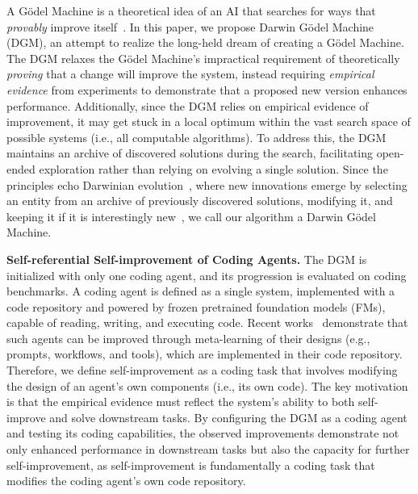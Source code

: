 \documentclass{article}
\begin{document}
A G\"odel Machine is a theoretical idea of an AI that searches for ways that \emph{provably} improve itself~\citep{schmidhuber2007godel}. In this paper, we propose Darwin G\"odel Machine (DGM), an attempt to realize the long-held dream of creating a G\"odel Machine. The DGM relaxes the G\"odel Machine's impractical requirement of theoretically \emph{proving} that a change will improve the system, instead requiring \emph{empirical evidence} from experiments to demonstrate that a proposed new version enhances performance. Additionally, since the DGM relies on empirical evidence of improvement, it may get stuck in a local optimum within the vast search space of possible systems (i.e., all computable algorithms). To address this, the DGM maintains an archive of discovered solutions during the search, facilitating open-ended exploration rather than relying on evolving a single solution. Since the principles echo Darwinian evolution~\citep{darwin2023origin}, where new innovations emerge by selecting an entity from an archive of previously discovered solutions, modifying it, and keeping it if it is interestingly new~\citep{zhang2024omni, faldor2025omni, stanley2015greatness}, we call our algorithm a Darwin G\"odel Machine.

\textbf{Self-referential Self-improvement of Coding Agents.}
The DGM is initialized with only one coding agent, and its progression is evaluated on coding benchmarks. A coding agent is defined as a single system, implemented with a code repository and powered by frozen pretrained foundation models (FMs), capable of reading, writing, and executing code. Recent works~\citep{hu2025automated, zhang2024aflow} demonstrate that such agents can be improved through meta-learning of their designs (e.g., prompts, workflows, and tools), which are implemented in their code repository. Therefore, we define self-improvement as a coding task that involves modifying the design of an agent's own components (i.e., its own code). The key motivation is that the empirical evidence must reflect the system's ability to both self-improve and solve downstream tasks. By configuring the DGM as a coding agent and testing its coding capabilities, the observed improvements demonstrate not only enhanced performance in downstream tasks but also the capacity for further self-improvement, as self-improvement is fundamentally a coding task that modifies the coding agent's own code repository.
\end{document}
